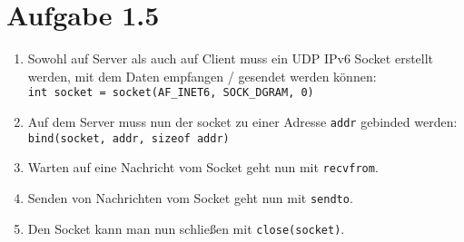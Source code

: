 \documentclass[12pt, a4paper]{article}
\begin{document}
\section*{Aufgabe 1.5}
\begin{enumerate}[label=\arabic*.]
	\item 	Sowohl auf Server als auch auf Client muss ein UDP IPv6 Socket erstellt werden, mit dem Daten empfangen / gesendet werden können:\\
			\verb|int socket = socket(AF_INET6, SOCK_DGRAM, 0)|
	\item 	Auf dem Server muss nun der socket zu einer Adresse \verb|addr| gebinded werden:\\
			\verb|bind(socket, addr, sizeof addr)|
	\item	Warten auf eine Nachricht vom Socket geht nun mit \verb|recvfrom|.
	\item	Senden von Nachrichten vom Socket geht nun mit \verb|sendto|.
	\item	Den Socket kann man nun schließen mit \verb|close(socket)|.
\end{enumerate}
\end{document}
